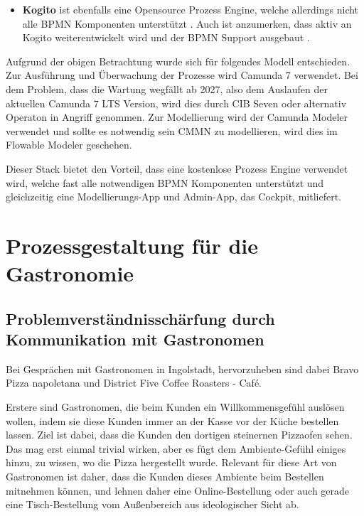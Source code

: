 \begin{itemize}
    \item \textbf{Kogito} ist ebenfalls eine Opensource Prozess Engine, welche allerdings nicht alle \ac{BPMN} Komponenten unterstützt \citep[vgl.][5.2.2]{kogito_kogito_2024-1}. Auch ist anzumerken, dass aktiv an Kogito weiterentwickelt wird und der \ac{BPMN} Support ausgebaut \citep[vgl.][]{redhat_release_2024}. 
\end{itemize}

Aufgrund der obigen Betrachtung wurde sich für folgendes Modell entschieden. Zur Ausführung und Überwachung der Prozesse wird Camunda 7 verwendet. Bei dem Problem, dass die Wartung wegfällt ab 2027, also dem Auslaufen der aktuellen Camunda 7 LTS Version, wird dies durch CIB Seven oder alternativ Operaton in Angriff genommen. Zur Modellierung wird der Camunda Modeler verwendet und sollte es notwendig sein \ac{CMMN} zu modellieren, wird dies im Flowable Modeler geschehen. 

Dieser Stack bietet den Vorteil, dass eine kostenlose Prozess Engine verwendet wird, welche fast alle notwendigen \ac{BPMN} Komponenten unterstützt und gleichzeitig eine Modellierungs-App und Admin-App, das Cockpit, mitliefert.

\section{Prozessgestaltung für die Gastronomie}
\label{sec:prozesse_gastronomie}
\subsection{Problemverständnisschärfung durch Kommunikation mit Gastronomen}
\label{sec:problemverstaendnis_gastronomie}
Bei Gesprächen mit Gastronomen in Ingolstadt, hervorzuheben sind dabei Bravo Pizza napoletana und District Five Coffee Roasters - Café.

Erstere sind Gastronomen, die beim Kunden ein Willkommensgefühl auslösen wollen, indem sie diese Kunden immer an der Kasse vor der Küche bestellen lassen. Ziel ist dabei, dass die Kunden den dortigen steinernen Pizzaofen sehen. Das mag erst einmal trivial wirken, aber es fügt dem Ambiente-Gefühl einiges hinzu, zu wissen, wo die Pizza hergestellt wurde.
Relevant für diese Art von Gastronomen ist daher, dass die Kunden dieses Ambiente beim Bestellen mitnehmen können, und lehnen daher eine Online-Bestellung oder auch gerade eine Tisch-Bestellung vom Außenbereich aus ideologischer Sicht ab.

